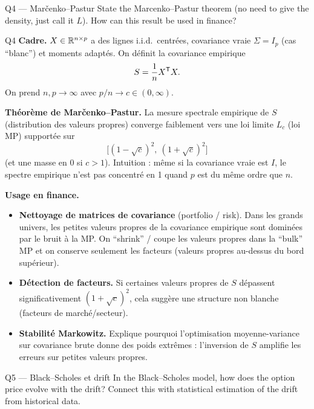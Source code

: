 \begin{questionbox}{Q4 --- Mar\v{c}enko--Pastur}
State the Marcenko--Pastur theorem (no need to give the density, just call it $L$). How can this result be used in finance?
\end{questionbox}

\begin{solutionbox}{Q4}
\textbf{Cadre.} $X\in\mathbb{R}^{n\times p}$ a des lignes i.i.d.\ centrées, covariance vraie $\Sigma=I_p$ (cas ``blanc'') et moments adaptés. On définit la covariance empirique
\[
S=\frac1n X^{\mathsf{T}} X.
\]
On prend $n,p\to\infty$ avec $p/n\to c\in(0,\infty)$.

\medskip
\textbf{Théorème de Mar\v{c}enko--Pastur.} La mesure spectrale empirique de $S$ (distribution des valeurs propres) converge faiblement vers une loi limite $L_c$ (loi MP) supportée sur
\[
\big[(1-\sqrt c)^2,\ (1+\sqrt c)^2\big]
\]
(et une masse en 0 si $c>1$). Intuition : même si la covariance vraie est $I$, le spectre empirique n'est pas concentré en 1 quand $p$ est du même ordre que $n$.

\medskip
\textbf{Usage en finance.}
\begin{itemize}[leftmargin=*]
  \item \textbf{Nettoyage de matrices de covariance} (portfolio / risk). Dans les grands univers, les petites valeurs propres de la covariance empirique sont dominées par le bruit \`a la MP. On ``shrink'' / coupe les valeurs propres dans la ``bulk'' MP et on conserve seulement les facteurs (valeurs propres au-dessus du bord supérieur).
  \item \textbf{Détection de facteurs.} Si certaines valeurs propres de $S$ dépassent significativement $(1+\sqrt c)^2$, cela suggère une structure non blanche (facteurs de marché/secteur).
  \item \textbf{Stabilité Markowitz.} Explique pourquoi l'optimisation moyenne-variance sur covariance brute donne des poids extrêmes : l'inversion de $S$ amplifie les erreurs sur petites valeurs propres.
\end{itemize}
\end{solutionbox}

\begin{questionbox}{Q5 --- Black--Scholes et drift}
In the Black--Scholes model, how does the option price evolve with the drift? Connect this with statistical estimation of the drift from historical data.
\end{questionbox}

